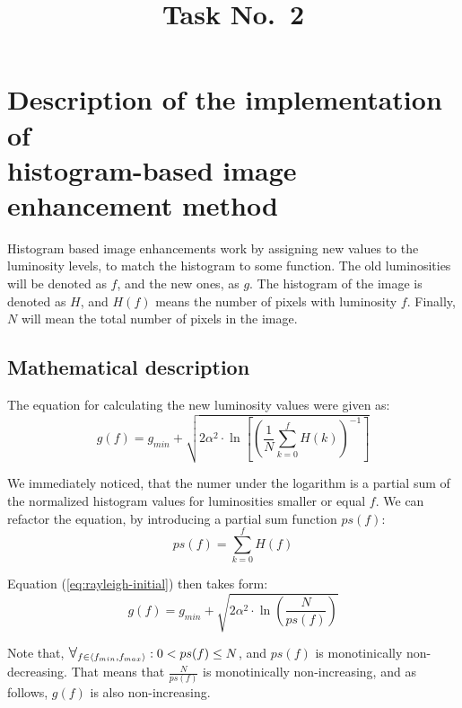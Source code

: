 \documentclass[12pt]{article}
\title{Task No.~2}
\begin{document}
\maketitle

\section{Description of the implementation of \texorpdfstring{\\ }{} histogram-based image enhancement method}
Histogram based image enhancements work by assigning new values to the luminosity levels, to match the histogram to some function.
The old luminosities will be denoted as $f$, and the new ones, as $g$.
The histogram of the image is denoted as $H$, and $H(f)$ means the number of pixels with luminosity $f$.
Finally, $N$ will mean the total number of pixels in the image.

\subsection{Mathematical description}

The equation for calculating the new luminosity values were given as:
\begin{equation}
    g(f) = g_{min} +\sqrt{
        2 \alpha^2 \cdot \ln\left[
            \left(
            \frac{1}{N} \sum\limits_{k=0}^f H(k)
            \right)^{-1}
            \right]
    }
    \label{eq:rayleigh-initial}
\end{equation}

We immediately noticed, that the numer under the logarithm is a partial sum of the normalized histogram values for luminosities smaller or equal $f$.
We can refactor the equation, by introducing a partial sum function $ps(f)$:
\begin{equation}
    ps(f) = \sum\limits_{k=0}^f H(f)
\end{equation}

Equation (\ref{eq:rayleigh-initial}) then takes form:
\begin{equation}
    g(f) = g_{min} + \sqrt{
        2 \alpha^2 \cdot \ln
        \left(
        \frac{N}{ps(f)}
        \right)}
\end{equation}

Note that,
\(
\bigforall_{f \in \langle f_{min},f_{max}\rangle} : 0 < ps(f) \leq N
\), and $ps(f)$ is monotinically non-decreasing.
That means that $\frac{N}{ps(f)}$ is monotinically non-increasing, and as follows, $g(f)$ is also non-increasing.
\end{document}
